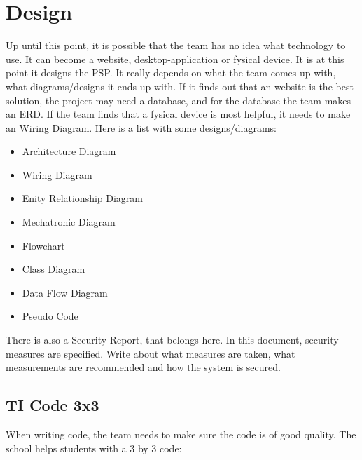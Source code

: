 \documentclass[10pt]{report}
\begin{document}
\newpage

\chapter{Design}
\thispagestyle{fancy}

Up until this point, it is possible that the team has no idea what technology to use. It can become a website, desktop-application or fysical device. It is at this point it designs the PSP. It really depends on what the team comes up with, what diagrams/designs it ends up with. If it finds out that an website is the best solution, the project may need a database, and for the database the team makes an ERD. If the team finds that a fysical device is most helpful, it needs to make an Wiring Diagram. Here is a list with some designs/diagrams:

\begin{itemize}
	\item Architecture Diagram
	\item Wiring Diagram
	\item Enity Relationship Diagram
	\item Mechatronic Diagram
	\item Flowchart
	\item Class Diagram
	\item Data Flow Diagram
	\item Pseudo Code
\end{itemize}

There is also a Security Report, that belongs here. In this document, security measures are specified. Write about what measures are taken, what measurements are recommended and how the system is secured.

\medskip
\minitoc

\newpage

\section{TI Code 3x3}

When writing code, the team needs to make sure the code is of good quality. The school helps students with a 3 by 3 code:
\end{document}
